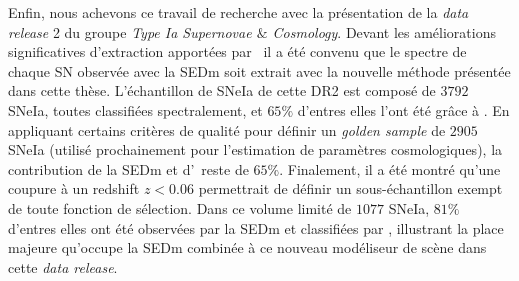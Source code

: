 \documentclass[../main/main.tex]{subfiles}
\begin{document}
Enfin, nous achevons ce travail de recherche avec la présentation de la
\textit{data release} 2 du groupe \textit{Type Ia Supernovae $\&$
  Cosmology}. Devant les améliorations significatives d'extraction
apportées par \hypergal\ il a été convenu que le spectre de chaque SN observée avec la
SEDm soit extrait avec la nouvelle méthode présentée dans cette
thèse. L'échantillon de SNeIa de cette DR2 est composé de $3792$ SNeIa, toutes classifiées
spectralement, et $65\%$ d'entres elles l'ont été
grâce à \hypergal. En appliquant certains critères de
qualité pour définir un \textit{golden sample} de $2905$ SNeIa (utilisé prochainement
pour l'estimation de paramètres cosmologiques), la contribution de la
SEDm et d'\hypergal\ reste de $65\%$. Finalement, il a été
montré qu'une coupure à un redshift $z<0.06$ permettrait de définir un
sous-échantillon exempt de toute fonction de sélection. Dans
ce volume limité de $1077$ SNeIa, $81\%$ d'entres elles ont été
observées par la SEDm et classifiées par \hypergal, illustrant la place
majeure qu'occupe la SEDm combinée à ce nouveau
modéliseur de scène dans cette \textit{data release}.
\end{document}
